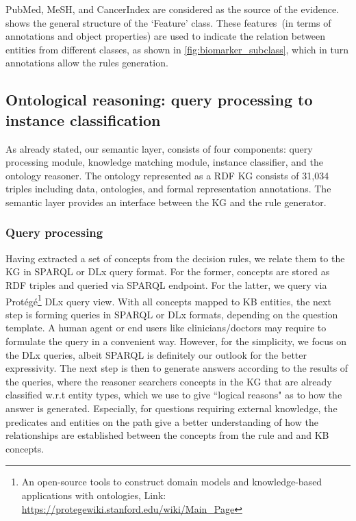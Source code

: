 \hspace*{3.5mm} PubMed, MeSH, and CancerIndex are considered as the source of the evidence.  shows the general structure of the `Feature' class. These features~(in terms of annotations and object properties) are used to indicate the relation between entities from different classes, as shown in \cref{fig:biomarker_subclass}, which in turn annotations allow the rules generation. 

\subsection{Ontological reasoning: query processing to instance classification}
As already stated, our semantic layer, consists of four components: query processing module, knowledge matching module, instance classifier, and the ontology reasoner. The ontology represented as a RDF KG consists of 31,034 triples including data, ontologies, and formal representation annotations. The semantic layer provides an interface between the KG and the rule generator. %

\subsubsection{Query processing}
Having extracted a set of concepts from the decision rules, we relate them to the KG in SPARQL or DLx query format. For the former, concepts are stored as RDF triples and queried via SPARQL endpoint. For the latter, we query via Prot{\'e}g{\'e}\footnote{An open-source tools to construct domain models and knowledge-based applications with ontologies, Link: \url{https://protegewiki.stanford.edu/wiki/Main_Page}} DLx query view. 
With all concepts mapped to KB entities, the next step is forming queries in SPARQL or DLx formats, depending on the question template. 
A human agent or end users like clinicians/doctors may require to formulate the query in a convenient way. However, for the simplicity, we focus on the DLx queries, albeit SPARQL is definitely our outlook for the better expressivity. The next step is then to generate answers according to the results of the queries, where the reasoner searchers concepts in the KG that are already classified w.r.t entity types, which we use to give ``logical reasons" as to how the answer is generated. Especially, for questions requiring external knowledge, the predicates and entities on the path give a better understanding of how the relationships are established between the concepts from the rule and and KB concepts. 

